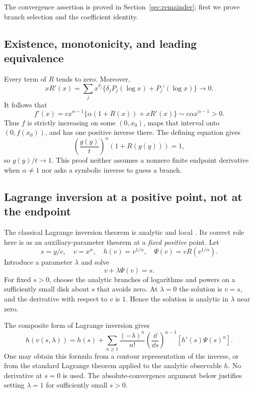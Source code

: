 \documentclass[11pt,a4paper]{article}
\numberwithin{equation}{section}
\theoremstyle{definition}\newtheorem{definition}[theorem]{Definition}
\theoremstyle{remark}\newtheorem{remark}[theorem]{Remark}
\begin{document}
The convergence assertion is proved in Section~\ref{sec:remainder}; first we prove branch selection and the coefficient identity.

\subsection{Existence, monotonicity, and leading equivalence}
Every term of $R$ tends to zero. Moreover,
\[
xR'(x)=\sum_jx^{\delta_j}\{\delta_jP_j(\log x)+P_j'(\log x)\}\longrightarrow0.
\]
It follows that
\begin{equation}\label{eq:slope}
f'(x)=cx^{\alpha-1}\{\alpha(1+R(x))+xR'(x)\}
\sim c\alpha x^{\alpha-1}>0.
\end{equation}
Thus $f$ is strictly increasing on some $(0,x_0)$, maps that interval onto $(0,f(x_0))$, and has one positive inverse there. The defining equation gives
\[
\left(\frac{g(y)}t\right)^\alpha(1+R(g(y)))=1,
\]
so $g(y)/t\to1$. This proof neither assumes a nonzero finite endpoint derivative when $\alpha\ne1$ nor asks a symbolic inverse to guess a branch.

\subsection{Lagrange inversion at a positive point, not at the endpoint}
The classical Lagrange inversion theorem is analytic and local \cite{dlmf}. Its correct role here is as an auxiliary-parameter theorem at a \emph{fixed positive} point. Let
\[
s=y/c,\quad v=x^\alpha,\quad h(v)=v^{1/\alpha},\quad
\Psi(v)=vR(v^{1/\alpha}).
\]
Introduce a parameter $\lambda$ and solve
\begin{equation}\label{eq:auxinverse}
v+\lambda\Psi(v)=s.
\end{equation}
For fixed $s>0$, choose the analytic branches of logarithms and powers on a sufficiently small disk about $s$ that avoids zero. At $\lambda=0$ the solution is $v=s$, and the derivative with respect to $v$ is $1$. Hence the solution is analytic in $\lambda$ near zero.

The composite form of Lagrange inversion gives
\begin{equation}\label{eq:compositeLB}
h(v(s,\lambda))=h(s)+
\sum_{n\ge1}\frac{(-\lambda)^n}{n!}
\left(\frac\dd{\dd s}\right)^{n-1}
\left[h'(s)\Psi(s)^n\right].
\end{equation}
One may obtain this formula from a contour representation of the inverse, or from the standard Lagrange theorem applied to the analytic observable $h$. No derivative at $s=0$ is used. The absolute-convergence argument below justifies setting $\lambda=1$ for sufficiently small $s>0$.
\end{document}
